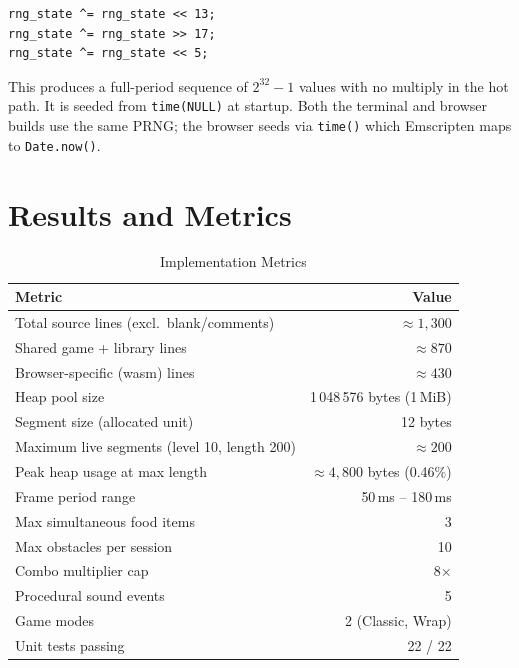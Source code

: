 \documentclass[conference]{IEEEtran}
\begin{document}
\begin{lstlisting}
rng_state ^= rng_state << 13;
rng_state ^= rng_state >> 17;
rng_state ^= rng_state << 5;
\end{lstlisting}

This produces a full-period sequence of $2^{32}-1$ values with no multiply
in the hot path. It is seeded from \texttt{time(NULL)} at startup. Both the
terminal and browser builds use the same PRNG; the browser seeds via
\texttt{time()} which Emscripten maps to \texttt{Date.now()}.

\section{Results and Metrics}

\begin{table}[h]
\centering
\caption{Implementation Metrics}
\begin{tabular}{lr}
\toprule
\textbf{Metric} & \textbf{Value} \\
\midrule
Total source lines (excl.\ blank/comments) & $\approx 1{,}300$ \\
Shared game + library lines                 & $\approx 870$ \\
Browser-specific (wasm) lines               & $\approx 430$ \\
Heap pool size                              & 1\,048\,576 bytes (1\,MiB) \\
Segment size (allocated unit)              & 12 bytes \\
Maximum live segments (level 10, length 200) & $\approx 200$ \\
Peak heap usage at max length              & $\approx 4{,}800$ bytes (0.46\%) \\
Frame period range                          & 50\,ms -- 180\,ms \\
Max simultaneous food items                 & 3 \\
Max obstacles per session                   & 10 \\
Combo multiplier cap                        & 8$\times$ \\
Procedural sound events                     & 5 \\
Game modes                                  & 2 (Classic, Wrap) \\
Unit tests passing                          & 22 / 22 \\
\bottomrule
\end{tabular}
\end{table}
\end{document}
